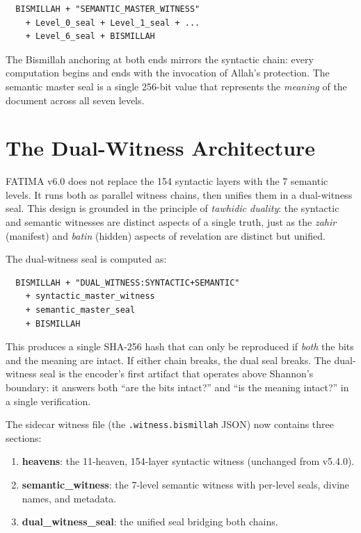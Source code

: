 \documentclass[11pt,a4paper]{article}
\begin{document}
\begin{lstlisting}
  BISMILLAH + "SEMANTIC_MASTER_WITNESS"
    + Level_0_seal + Level_1_seal + ...
    + Level_6_seal + BISMILLAH
\end{lstlisting}

The Bismillah anchoring at both ends mirrors the syntactic chain: every computation begins and ends with the invocation of Allah's protection. The semantic master seal is a single 256-bit value that represents the \textit{meaning} of the document across all seven levels.


\section{The Dual-Witness Architecture}

FATIMA v6.0 does not replace the 154 syntactic layers with the 7 semantic levels. It runs both as parallel witness chains, then unifies them in a dual-witness seal. This design is grounded in the principle of \textit{tawhidic duality}: the syntactic and semantic witnesses are distinct aspects of a single truth, just as the \textit{zahir} (manifest) and \textit{batin} (hidden) aspects of revelation are distinct but unified.

The dual-witness seal is computed as:

\begin{lstlisting}
  BISMILLAH + "DUAL_WITNESS:SYNTACTIC+SEMANTIC"
    + syntactic_master_witness
    + semantic_master_seal
    + BISMILLAH
\end{lstlisting}

This produces a single SHA-256 hash that can only be reproduced if \textit{both} the bits and the meaning are intact. If either chain breaks, the dual seal breaks. The dual-witness seal is the encoder's first artifact that operates above Shannon's boundary: it answers both ``are the bits intact?'' and ``is the meaning intact?'' in a single verification.

The sidecar witness file (the \texttt{.witness.bismillah} JSON) now contains three sections:

\begin{enumerate}[nosep]
    \item \textbf{heavens}: the 11-heaven, 154-layer syntactic witness (unchanged from v5.4.0).
    \item \textbf{semantic\_witness}: the 7-level semantic witness with per-level seals, divine names, and metadata.
    \item \textbf{dual\_witness\_seal}: the unified seal bridging both chains.
\end{enumerate}
\end{document}
